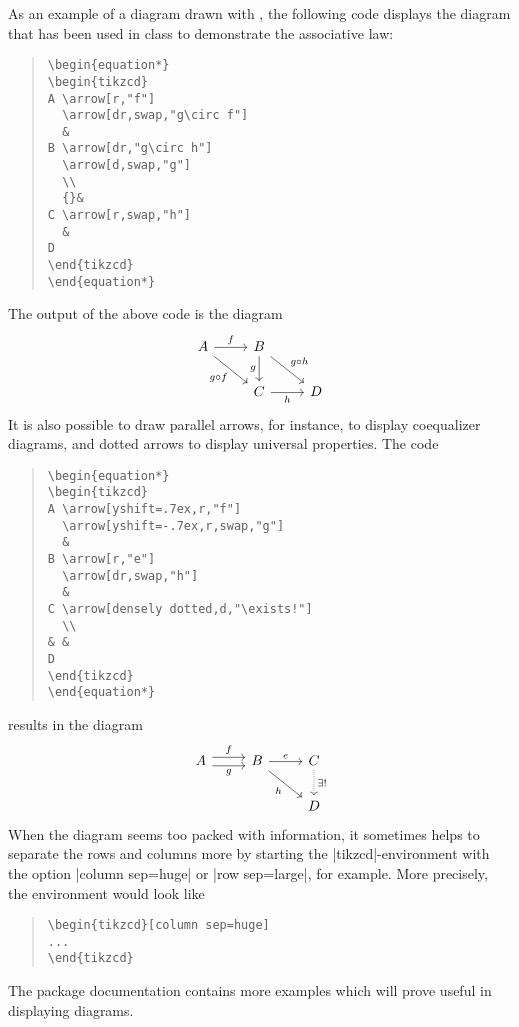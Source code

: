 As an example of a diagram drawn with , the following code displays
the diagram that has been used in class to demonstrate the associative law:
\begin{quote}
\begin{verbatim}
\begin{equation*}
\begin{tikzcd}
A \arrow[r,"f"]
  \arrow[dr,swap,"g\circ f"]
  &
B \arrow[dr,"g\circ h"]
  \arrow[d,swap,"g"]
  \\
  {}&
C \arrow[r,swap,"h"]
  &
D
\end{tikzcd}
\end{equation*}
\end{verbatim}
\end{quote}
The output of the above code is the diagram
\begin{equation*}
\begin{tikzcd}
A \arrow[r,"f"]
  \arrow[dr,swap,"g\circ f"]
  &
B \arrow[dr,"g\circ h"]
  \arrow[d,swap,"g"]
  \\
  {}&
C \arrow[r,swap,"h"]
  &
D
\end{tikzcd}
\end{equation*}
It is also possible to draw parallel arrows, for instance, to display coequalizer
diagrams, and dotted arrows to display universal properties. The code
\begin{quote}
\begin{verbatim}
\begin{equation*}
\begin{tikzcd}
A \arrow[yshift=.7ex,r,"f"]
  \arrow[yshift=-.7ex,r,swap,"g"]
  &
B \arrow[r,"e"]
  \arrow[dr,swap,"h"]
  &
C \arrow[densely dotted,d,"\exists!"]
  \\
& &
D
\end{tikzcd}
\end{equation*}
\end{verbatim}
\end{quote}
results in the diagram
\begin{equation*}
\begin{tikzcd}
A \arrow[yshift=.7ex,r,"f"]
  \arrow[yshift=-.7ex,r,swap,"g"]
  &
B \arrow[r,"e"]
  \arrow[dr,swap,"h"]
  &
C \arrow[densely dotted,d,"\exists!"]
  \\
& &
D
\end{tikzcd}
\end{equation*}
When the diagram seems too packed with information, it sometimes helps to
separate the rows and columns more by starting the |tikzcd|-environment
with the option |column sep=huge| or |row sep=large|, for example.
More precisely, the environment would look like
\begin{quote}
\begin{verbatim}
\begin{tikzcd}[column sep=huge]
...
\end{tikzcd}
\end{verbatim}
\end{quote}
The package documentation contains more examples which will prove useful in
displaying diagrams.

